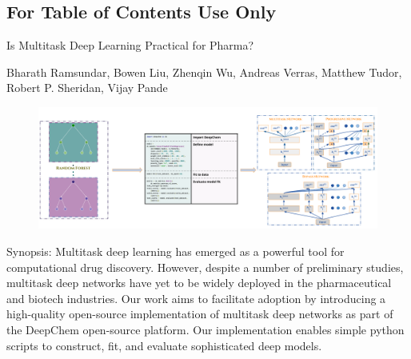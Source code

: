 \newpage
\subsection{For Table of Contents Use Only}
{\huge Is Multitask Deep Learning Practical for Pharma?}

{\Large Bharath Ramsundar, Bowen Liu, Zhenqin Wu, Andreas Verras, Matthew Tudor, Robert P. Sheridan, Vijay Pande}

\begin{figure}[H]
\includegraphics[scale=0.25]{Images/multitask_TOC.png}
\end{figure}

Synopsis: Multitask deep learning has emerged as a powerful tool for computational drug discovery. However, despite a number of preliminary studies, multitask deep networks have yet to be widely deployed in the pharmaceutical and biotech industries. Our work aims to facilitate adoption by introducing a high-quality open-source implementation of multitask deep networks as part of the DeepChem open-source platform. Our implementation enables simple python scripts to construct, fit, and evaluate sophisticated deep models.
